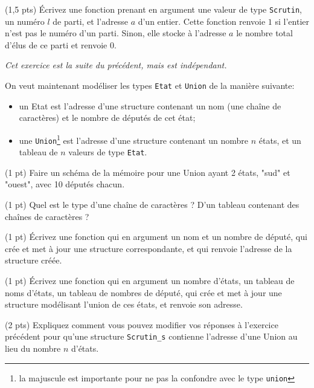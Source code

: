 \question (1,5 pts) Écrivez une fonction prenant en argument une
valeur de type \texttt{Scrutin}, un numéro \(l\) de parti, et
l'adresse \(a\) d'un entier.  Cette fonction renvoie \(1\) si l'entier
n'est pas le numéro d'un parti. Sinon, elle stocke à l'adresse \(a\)
le nombre total d'élus de ce parti et renvoie \(0\).



\textit{Cet exercice est la suite du précédent, mais est indépendant.}

On veut maintenant modéliser les types \texttt{Etat} et \texttt{Union}
de la manière suivante:
\begin{itemize}
\item un Etat est l'adresse d'une structure contenant un nom (une
  chaîne de caractères) et le nombre de députés de cet état;
\item une \texttt{Union}\footnote{la majuscule est importante pour ne
    pas la confondre avec le type \texttt{union}} est l'adresse d'une
  structure contenant un nombre \(n\) états, et un tableau de \(n\)
  valeurs de type \texttt{Etat}.
\end{itemize}

\question (1 pt) Faire un schéma de la mémoire pour une Union ayant 2
états, "sud" et "ouest", avec 10 députés chacun.

\question (1 pt) Quel est le type d'une chaîne de caractères ? D'un
tableau contenant des chaînes de caractères ?

\question (1 pt) Écrivez une fonction qui en argument un nom et un
nombre de député, qui crée et met à jour une structure correspondante,
et qui renvoie l'adresse de la structure créée.

\question (1 pt) Écrivez une fonction qui en argument un nombre
d'états, un tableau de noms d'états, un tableau de nombres de député,
qui crée et met à jour une structure modélisant l'union de ces états,
et renvoie son adresse.

\question (2 pts) Expliquez comment vous pouvez modifier vos réponses
à l'exercice précédent pour qu'une structure \texttt{Scrutin\_s}
contienne l'adresse d'une Union au lieu du nombre \(n\) d'états.







